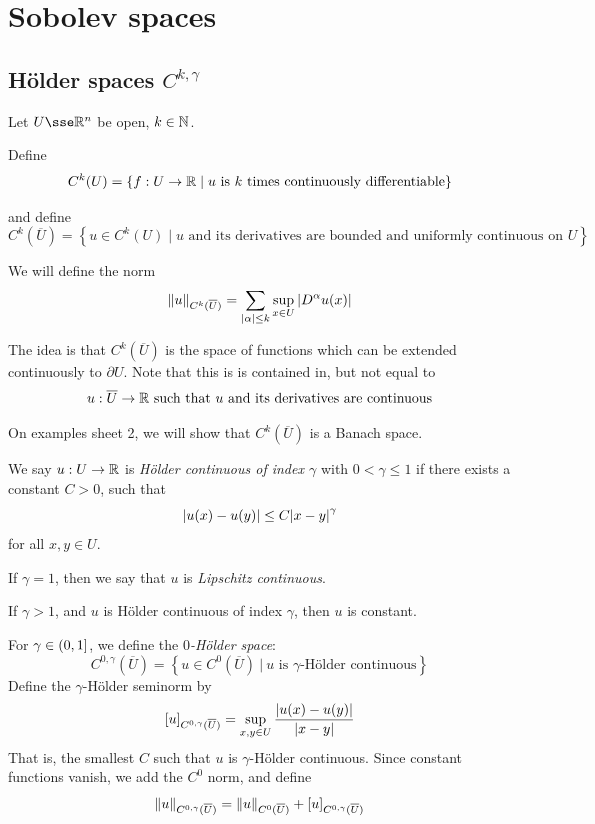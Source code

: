 \documentclass{article}
\begin{document}
\section{Sobolev spaces}

\subsection{H\"older spaces \(C^{k, \gamma}\)}

Let \(U \sse \R^n\) be open, \(k \in \mathbb{N}\). 

\begin{definition}
    [\(C^k\) spaces]
    Define
    \[C^k(U) = \left\{f : U \to \mathbb{R} \mid u\text{ is }k\text{ times continuously differentiable}\right\}\]
    
    and define
    \[C^k(\overline U) = \left\{u \in C^k(U) \mid u \text{ and its derivatives are bounded and uniformly continuous on }U\right\}\]

    We will define the norm
    \[\norm{u}_{C^k(\overline U)} = \sum_{\abs{\alpha} \le k}\sup_{x \in U}\abs{D^\alpha u(x)}\]
\end{definition}

The idea is that \(C^k(\overline U)\) is the space of functions which can be extended continuously to \(\partial U\). Note that this is is contained in, but not equal to
\[u : \overline U \to \mathbb{R} \text{ such that }u \text{ and its derivatives are continuous}\]

On examples sheet 2, we will show that \(C^k(\overline U)\) is a Banach space.

\begin{definition}
    We say \(u : U \to \mathbb{R}\) is \emph{H\"older continuous of index \(\gamma\)} with \(0 < \gamma \le 1\) if there exists a constant \(C > 0\), such that
    \[\abs{u(x) - u(y)} \le C\abs{x-y}^\gamma\]
    for all \(x, y \in U\).

    If \(\gamma = 1\), then we say that \(u\) is \emph{Lipschitz continuous}.
\end{definition}

\begin{remark}
    If \(\gamma > 1\), and \(u\) is H\"older continuous of index \(\gamma\), then \(u\) is constant.
\end{remark}

\begin{definition}
    For \(\gamma \in (0, 1]\), we define the \emph{\(0\)-H\"older space}:
    \[C^{0, \gamma}(\overline U) = \left\{u \in C^0(\overline U) \ \big\vert\ u \text{ is }\gamma\text{-H\"older continuous}\right\}\]
    Define the \(\gamma\)-H\"older seminorm by
    \[[u]_{C^{0, \gamma}(\overline U)} = \sup_{x, y \in U}\frac{\abs{u(x) -  u(y)}}{\abs{x - y}}\]
    That is, the smallest \(C\) such that \(u\) is \(\gamma\)-H\"older continuous. Since constant functions vanish, we add the \(C^0\) norm, and define
    \[\norm{u}_{C^{0, \gamma}(\overline U)} = \norm{u}_{C^0(\overline U)} + [u]_{C^{0, \gamma}(\overline U)}\]
\end{definition}
\end{document}
